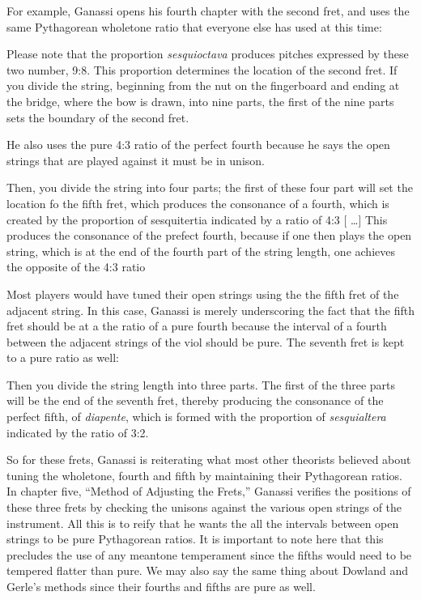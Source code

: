 For example, Ganassi opens his fourth chapter with the second fret, and uses the same
Pythagorean wholetone ratio that everyone else has used at this time:
\begin{blocks}
Please note that the proportion \emph{sesquioctava} produces pitches expressed
by these two number, 9:8.  This proportion determines the location of the second
fret.  If you divide the string, beginning from the nut on the fingerboard and
ending at the bridge, where the bow is drawn, into nine parts, the first of the
nine parts sets the boundary of the second fret.
\end{blocks}
He also uses the pure 4:3 ratio of the
perfect fourth because he says the open strings that are played against it must
be in unison.
\begin{blocks}
Then, you divide the string into four parts; the first of these four part will
set the location fo the fifth fret, which produces the consonance of a fourth,
which is created by the proportion of sesquitertia indicated by a ratio of 4:3
[ \ldots ] This produces the consonance of the prefect fourth, because if
one then plays the open string, which is at the end of the fourth part of the
string length, one achieves the opposite of the 4:3 ratio
\end{blocks}
Most players would have tuned their open strings using the the fifth fret of the
adjacent string.  In this case, Ganassi is merely underscoring the fact that the fifth
fret should be at a the ratio of a pure fourth because the interval of a fourth between
the adjacent strings of the viol should be pure. The seventh fret is kept to a pure
ratio as well:
\begin{blocks}
Then you divide the string length into three parts. The first of the three parts will
be the end of the seventh fret, thereby producing the consonance of the perfect fifth,
of \textit{diapente}, which is formed with the proportion of \textit{sesquialtera}
indicated by the ratio of 3:2.
\end{blocks}

So for these frets, Ganassi is reiterating what most other theorists believed about
tuning the wholetone, fourth and fifth by maintaining their Pythagorean ratios. In
chapter five, ``Method of Adjusting the Frets,'' Ganassi verifies the positions of
these three frets by checking the unisons against the various open strings of the
instrument.  All this is to reify that he wants the all the intervals between open
strings to be pure Pythagorean ratios.  It is important to note here that this
precludes the use of any meantone temperament since the fifths would need to be
tempered flatter than pure.  We may also say the same thing about Dowland and Gerle's
methods since their fourths and fifths are pure as well.

